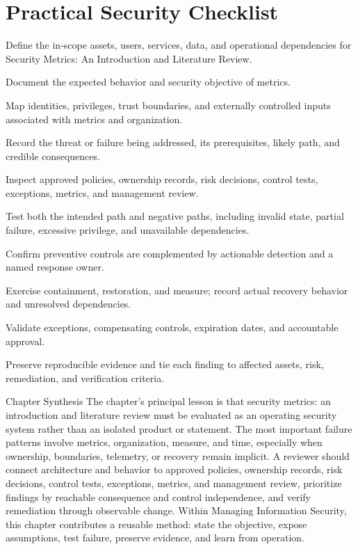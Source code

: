 \documentclass[11pt,letterpaper]{article}
\begin{document}
\section*{Practical Security Checklist}
\begin{CornellChecklist}
\item Define the in-scope assets, users, services, data, and operational dependencies for Security Metrics: An Introduction and Literature Review.
\item Document the expected behavior and security objective of metrics.
\item Map identities, privileges, trust boundaries, and externally controlled inputs associated with metrics and organization.
\item Record the threat or failure being addressed, its prerequisites, likely path, and credible consequences.
\item Inspect approved policies, ownership records, risk decisions, control tests, exceptions, metrics, and management review.
\item Test both the intended path and negative paths, including invalid state, partial failure, excessive privilege, and unavailable dependencies.
\item Confirm preventive controls are complemented by actionable detection and a named response owner.
\item Exercise containment, restoration, and measure; record actual recovery behavior and unresolved dependencies.
\item Validate exceptions, compensating controls, expiration dates, and accountable approval.
\item Preserve reproducible evidence and tie each finding to affected assets, risk, remediation, and verification criteria.
\end{CornellChecklist}
\begin{CornellSummaryBox}{Chapter Synthesis}
The chapter's principal lesson is that security metrics: an introduction and literature review must be evaluated as an operating security system rather than an isolated product or statement. The most important failure patterns involve metrics, organization, measure, and time, especially when ownership, boundaries, telemetry, or recovery remain implicit. A reviewer should connect architecture and behavior to approved policies, ownership records, risk decisions, control tests, exceptions, metrics, and management review, prioritize findings by reachable consequence and control independence, and verify remediation through observable change. Within Managing Information Security, this chapter contributes a reusable method: state the objective, expose assumptions, test failure, preserve evidence, and learn from operation.
\end{CornellSummaryBox}
\end{document}
